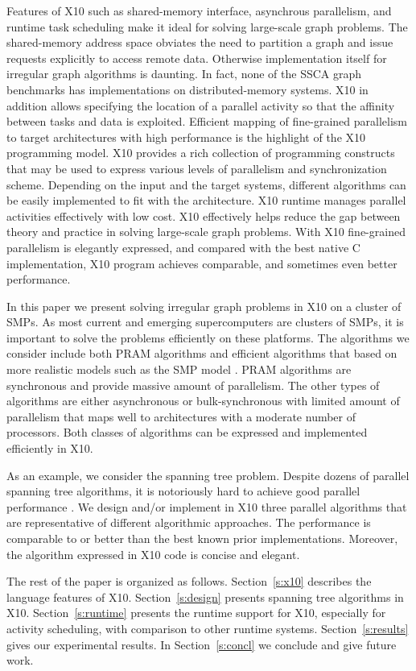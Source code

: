 Features of X10 such as shared-memory interface, asynchrous parallelism, and runtime task scheduling make it ideal for solving large-scale graph problems. The shared-memory address space obviates the need to partition a graph and issue requests explicitly to access remote data. Otherwise implementation itself for irregular graph algorithms is daunting. In fact, none of the SSCA \cite{KK05} graph benchmarks has implementations on distributed-memory systems. X10 in addition allows specifying the location of a parallel activity so that the affinity between tasks and data is exploited. 
Efficient mapping of fine-grained parallelism to target architectures with high performance is the highlight of the X10 programming model. X10 provides a rich collection of programming constructs that may be used to express various levels of parallelism and synchronization scheme. Depending on the input and the target systems, different algorithms can be easily implemented to fit with the architecture. X10 runtime manages parallel activities effectively with low cost.
X10 effectively helps reduce the gap between theory and practice in solving large-scale graph problems. With X10 fine-grained parallelism is elegantly expressed, and compared with the best native C implementation, X10 program achieves comparable, and sometimes even better performance. 


 In this paper we present solving irregular graph problems in X10 on a cluster of SMPs. As most current and emerging supercomputers are clusters of SMPs, it is important to solve the problems efficiently on these platforms. The algorithms we consider include both PRAM algorithms and efficient algorithms that based on more realistic models such as the SMP model \cite{HJ01}. PRAM algorithms are synchronous and provide massive amount of parallelism. The other types of algorithms are either asynchronous or bulk-synchronous with limited amount of parallelism that maps well to architectures with a moderate number of processors. Both classes of algorithms can be expressed and implemented efficiently in X10.

As an example, we consider the spanning tree problem. Despite dozens of parallel spanning tree algorithms, it is notoriously hard to achieve good parallel performance \cite{BC04a}. We design and/or implement in X10 three parallel algorithms that are representative of different algorithmic approaches. The performance is comparable to or better than the best known prior implementations. Moreover, the algorithm expressed in X10 code is concise and elegant.

 The rest of the paper is organized as follows. Section~\ref{s:x10} describes the language features of X10. Section~\ref{s:design} presents spanning tree algorithms in X10. Section~\ref{s:runtime} presents the runtime support for X10, especially for activity scheduling, with comparison to other runtime systems. 
 Section~\ref{s:results} gives our experimental results. In Section~\ref{s:concl} we conclude and give future work. 
  



